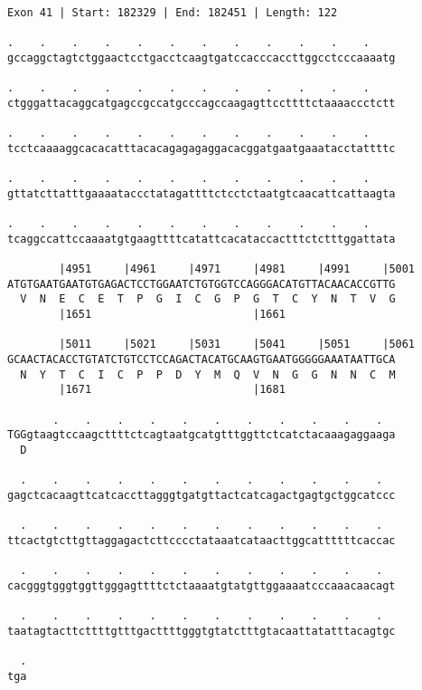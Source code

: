 \documentclass{article}
\begin{document}
\newpage
\begin{Verbatim}
Exon 41 | Start: 182329 | End: 182451 | Length: 122
 
.    .    .    .    .    .    .    .    .    .    .    .    
gccaggctagtctggaactcctgacctcaagtgatccacccaccttggcctcccaaaatg
  
.    .    .    .    .    .    .    .    .    .    .    .    
ctgggattacaggcatgagccgccatgcccagccaagagttccttttctaaaaccctctt
  
.    .    .    .    .    .    .    .    .    .    .    .    
tcctcaaaaggcacacatttacacagagagaggacacggatgaatgaaatacctattttc
  
.    .    .    .    .    .    .    .    .    .    .    .    
gttatcttatttgaaaataccctatagattttctcctctaatgtcaacattcattaagta
  
.    .    .    .    .    .    .    .    .    .    .    .    
tcaggccattccaaaatgtgaagttttcatattcacataccactttctctttggattata
  
        |4951     |4961     |4971     |4981     |4991     |5001
ATGTGAATGAATGTGAGACTCCTGGAATCTGTGGTCCAGGGACATGTTACAACACCGTTG
  V  N  E  C  E  T  P  G  I  C  G  P  G  T  C  Y  N  T  V  G
        |1651                         |1661                 
  
        |5011     |5021     |5031     |5041     |5051     |5061
GCAACTACACCTGTATCTGTCCTCCAGACTACATGCAAGTGAATGGGGGAAATAATTGCA
  N  Y  T  C  I  C  P  P  D  Y  M  Q  V  N  G  G  N  N  C  M
        |1671                         |1681                 
  
       .    .    .    .    .    .    .    .    .    .    .  
TGGgtaagtccaagcttttctcagtaatgcatgtttggttctcatctacaaagaggaaga
  D                                                         
  
  .    .    .    .    .    .    .    .    .    .    .    .  
gagctcacaagttcatcaccttagggtgatgttactcatcagactgagtgctggcatccc
  
  .    .    .    .    .    .    .    .    .    .    .    .  
ttcactgtcttgttaggagactcttcccctataaatcataacttggcattttttcaccac
  
  .    .    .    .    .    .    .    .    .    .    .    .  
cacgggtgggtggttgggagttttctctaaaatgtatgttggaaaatcccaaacaacagt
  
  .    .    .    .    .    .    .    .    .    .    .    .  
taatagtacttcttttgtttgacttttgggtgtatctttgtacaattatatttacagtgc
  
  .
tga
\end{Verbatim}
\newpage
\end{document}
